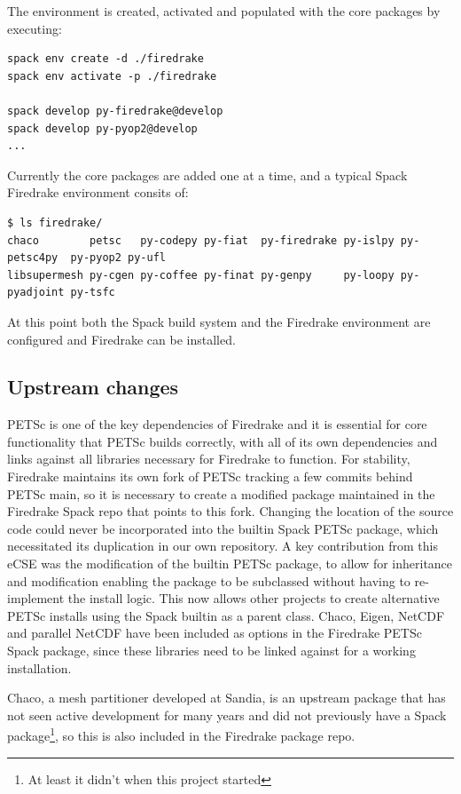 \documentclass[a4paper,11pt]{article}
\begin{document}
The environment is created, activated and populated with the core packages by executing:
\begin{lstlisting}
spack env create -d ./firedrake
spack env activate -p ./firedrake

spack develop py-firedrake@develop
spack develop py-pyop2@develop
...
\end{lstlisting}

Currently the core packages are added one at a time, and a typical Spack Firedrake environment consits of:
\begin{lstlisting}
$ ls firedrake/
chaco        petsc   py-codepy py-fiat  py-firedrake py-islpy py-petsc4py  py-pyop2 py-ufl
libsupermesh py-cgen py-coffee py-finat py-genpy     py-loopy py-pyadjoint py-tsfc
\end{lstlisting}
At this point both the Spack build system and the Firedrake environment are configured and Firedrake can be installed.


\subsection{Upstream changes}
\label{ssec:changes}
PETSc is one of the key dependencies of Firedrake and it is essential for core functionality that PETSc builds correctly, with all of its own dependencies and links against all libraries necessary for Firedrake to function.
For stability, Firedrake maintains its own fork of PETSc tracking a few commits behind PETSc main, so it is necessary to create a modified package maintained in the Firedrake Spack repo that points to this fork.
Changing the location of the source code could never be incorporated into the builtin Spack PETSc package, which necessitated its duplication in our own repository.
A key contribution from this eCSE was the modification of the builtin PETSc package, to allow for inheritance and modification enabling the package to be subclassed without having to re-implement the install logic.
This now allows other projects to create alternative PETSc installs using the Spack builtin as a parent class.
Chaco, Eigen, NetCDF and parallel NetCDF have been included as options in the Firedrake PETSc Spack package, since these libraries need to be linked against for a working installation.

Chaco, a mesh partitioner developed at Sandia, is an upstream package that has not seen active development for many years and did not previously have a Spack package\footnote{At least it didn't when this project started}, so this is also included in the Firedrake package repo.
\end{document}
